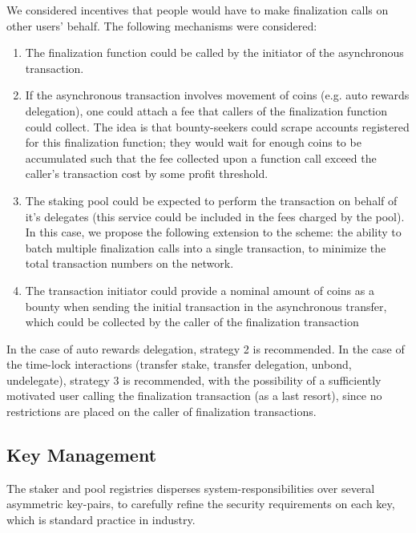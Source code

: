 We considered incentives that people would have to make finalization calls on other users' behalf. The following mechanisms were considered:
\begin{enumerate}
    \item The finalization function could be called by the initiator of the asynchronous transaction. 
    \item If the asynchronous transaction involves movement of coins (e.g. auto rewards delegation), one could attach a fee that callers of the finalization function could collect. The idea is that bounty-seekers could scrape accounts registered for this finalization function; they would wait for enough coins to be accumulated such that the fee collected upon a function call exceed the caller's transaction cost by some profit threshold. 
    \item The staking pool could be expected to perform the transaction on behalf of it's delegates (this service could be included in the fees charged by the pool). In this case, we propose the following extension to the scheme: the ability to batch multiple finalization calls into a single transaction, to minimize the total transaction numbers on the network. 
    \item The transaction initiator could provide a nominal amount of coins as a bounty when sending the initial transaction in the asynchronous transfer, which could be collected by the caller of the finalization transaction
\end{enumerate}

In the case of auto rewards delegation, strategy 2 is recommended. In the case of the time-lock interactions (transfer stake, transfer delegation, unbond, undelegate), strategy 3 is recommended, with the possibility of a sufficiently motivated user calling the finalization transaction (as a last resort), since no restrictions are placed on the caller of finalization transactions. 

\subsection{Key Management} \label{key_management}
The staker and pool registries disperses system-responsibilities over several asymmetric key-pairs, to carefully refine the security requirements on each key, which is standard practice in industry.

